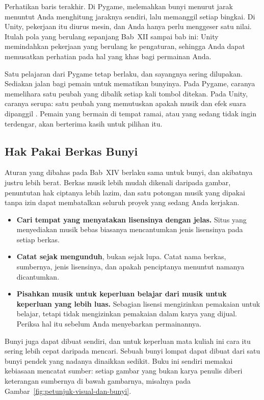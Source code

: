 Perhatikan baris terakhir. Di Pygame, melemahkan bunyi menurut jarak menuntut
Anda menghitung jaraknya sendiri, lalu memanggil  setiap
bingkai. Di Unity, pekerjaan itu diurus mesin, dan Anda hanya perlu menggeser
satu nilai. Itulah pola yang berulang sepanjang Bab~XII sampai bab ini: Unity
memindahkan pekerjaan yang berulang ke pengaturan, sehingga Anda dapat
memusatkan perhatian pada hal yang khas bagi permainan Anda.

Satu pelajaran dari Pygame tetap berlaku, dan sayangnya sering dilupakan.
Sediakan jalan bagi pemain untuk mematikan bunyinya. Pada Pygame, caranya
memelihara satu peubah yang dibalik setiap kali tombol ditekan. Pada Unity,
caranya serupa: satu peubah yang memutuskan apakah musik dan efek suara
dipanggil \cite{stmikjayakarta-pygame}. Pemain yang bermain di tempat ramai,
atau yang sedang tidak ingin terdengar, akan berterima kasih untuk pilihan itu.

\subsection{Hak Pakai Berkas Bunyi}

Aturan yang dibahas pada Bab~XIV berlaku sama untuk bunyi, dan akibatnya justru
lebih berat. Berkas musik lebih mudah dikenali daripada gambar, penuntutan hak
ciptanya lebih lazim, dan satu potongan musik yang dipakai tanpa izin dapat
membatalkan seluruh proyek yang sedang Anda kerjakan.

\begin{itemize}
  \item \textbf{Cari tempat yang menyatakan lisensinya dengan jelas.} Situs
        yang menyediakan musik bebas biasanya mencantumkan jenis lisensinya
        pada setiap berkas.
  \item \textbf{Catat sejak mengunduh}, bukan sejak lupa. Catat nama berkas,
        sumbernya, jenis lisensinya, dan apakah penciptanya menuntut namanya
        dicantumkan.
  \item \textbf{Pisahkan musik untuk keperluan belajar dari musik untuk
        keperluan yang lebih luas.} Sebagian lisensi mengizinkan pemakaian
        untuk belajar, tetapi tidak mengizinkan pemakaian dalam karya yang
        dijual. Periksa hal itu sebelum Anda menyebarkan permainannya.
\end{itemize}

\begin{tipsbox}
Bunyi juga dapat dibuat sendiri, dan untuk keperluan mata kuliah ini cara itu
sering lebih cepat daripada mencari. Sebuah bunyi lompat dapat dibuat dari satu
bunyi pendek yang nadanya dinaikkan sedikit. Buku ini sendiri memakai kebiasaan
mencatat sumber: setiap gambar yang bukan karya penulis diberi keterangan
sumbernya di bawah gambarnya, misalnya pada
Gambar~\ref{fig:petunjuk-visual-dan-bunyi}.
\end{tipsbox}

